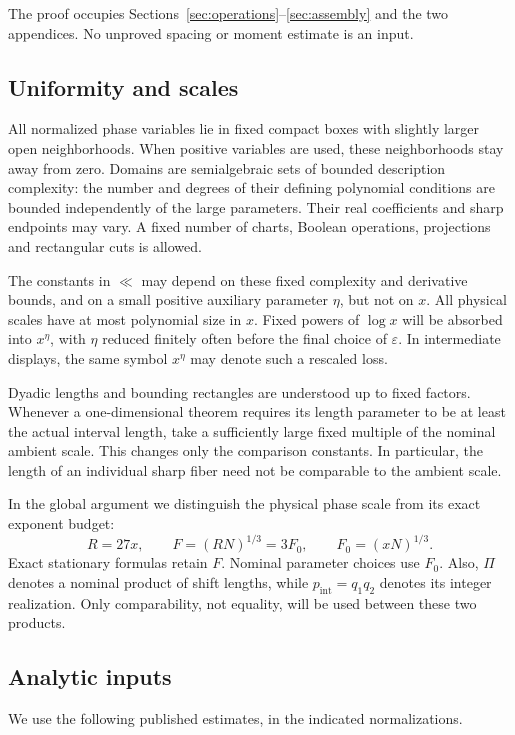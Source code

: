 \documentclass[11pt,a4paper]{article}
\numberwithin{equation}{section}
\theoremstyle{remark}
\newcommand{\eps}{\varepsilon}
\newcommand{\pint}{p_{\mathrm{int}}}
\newcommand{\Fzero}{F_0}
\begin{document}
The proof occupies Sections~\ref{sec:operations}--\ref{sec:assembly} and the
two appendices. No unproved spacing or moment estimate is an input.

\subsection{Uniformity and scales}
All normalized phase variables lie in fixed compact boxes with slightly larger
open neighborhoods. When positive variables are used, these neighborhoods stay
away from zero. Domains are semialgebraic sets of bounded description
complexity: the number and degrees of their defining polynomial conditions are
bounded independently of the large parameters. Their real coefficients and
sharp endpoints may vary. A fixed number of charts, Boolean operations,
projections and rectangular cuts is allowed.

The constants in $\ll$ may depend on these fixed complexity and derivative
bounds, and on a small positive auxiliary parameter $\eta$, but not on $x$.
All physical scales have at most polynomial size in $x$. Fixed powers of
$\log x$ will be absorbed into $x^\eta$, with $\eta$ reduced finitely often
before the final choice of $\eps$. In intermediate displays, the same symbol
$x^\eta$ may denote such a rescaled loss.

Dyadic lengths and bounding rectangles are understood up to fixed factors.
Whenever a one-dimensional theorem requires its length parameter to be at
least the actual interval length, take a sufficiently large fixed multiple of
the nominal ambient scale. This changes only the comparison constants. In
particular, the length of an individual sharp fiber need not be comparable to
the ambient scale.

In the global argument we distinguish the physical phase scale from its exact
exponent budget:
\begin{equation}\label{eq:F-convention}
 R=27x,\qquad F=(RN)^{1/3}=3\Fzero,
 \qquad \Fzero=(xN)^{1/3}.
\end{equation}
Exact stationary formulas retain $F$. Nominal parameter choices use $\Fzero$.
Also, $\Pi$ denotes a nominal product of shift lengths, while
$\pint=q_1q_2$ denotes its integer realization. Only comparability, not equality,
will be used between these two products.

\subsection{Analytic inputs}
We use the following published estimates, in the indicated normalizations.
\end{document}
